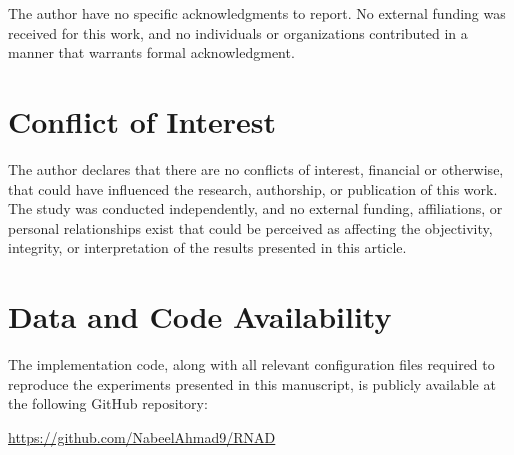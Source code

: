 \documentclass[11pt]{article}
\begin{document}
The author have no specific acknowledgments to report. No external
funding was received for this work, and no individuals or organizations
contributed in a manner that warrants formal acknowledgment.

\section*{Conflict of Interest}
The author declares that there are no conflicts of interest, financial or otherwise, that could have influenced the research, authorship, or publication of this work. The study was conducted independently, and no external funding, affiliations, or personal relationships exist that could be perceived as affecting the objectivity, integrity, or interpretation of the results presented in this article.

\section*{Data and Code Availability}

The implementation code, along with all relevant configuration files required to reproduce the experiments presented in this manuscript, is publicly available at the following GitHub repository:

\url{https://github.com/NabeelAhmad9/RNAD}
\end{document}
